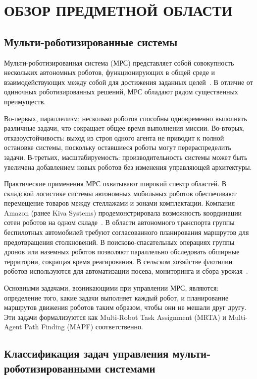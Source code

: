 \section{ОБЗОР ПРЕДМЕТНОЙ ОБЛАСТИ}

\subsection{Мульти-роботизированные системы}

Мульти-роботизированная система (МРС) представляет собой совокупность нескольких автономных роботов, функционирующих в общей среде и взаимодействующих между собой для достижения заданных целей~\cite{parker2008mrs}. В отличие от одиночных роботизированных решений, МРС обладают рядом существенных преимуществ.

Во-первых, параллелизм: несколько роботов способны одновременно выполнять различные задачи, что сокращает общее время выполнения миссии. Во-вторых, отказоустойчивость: выход из строя одного агента не приводит к полной остановке системы, поскольку оставшиеся роботы могут перераспределить задачи. В-третьих, масштабируемость: производительность системы может быть увеличена добавлением новых роботов без изменения управляющей архитектуры.

Практические применения МРС охватывают широкий спектр областей. В складской логистике системы автономных мобильных роботов обеспечивают перемещение товаров между стеллажами и зонами комплектации. Компания Amazon (ранее Kiva Systems) продемонстрировала возможность координации сотен роботов на одном складе~\cite{wurman2008kiva}. В области автономного транспорта группы беспилотных автомобилей требуют согласованного планирования маршрутов для предотвращения столкновений. В поисково-спасательных операциях группы дронов или наземных роботов позволяют параллельно обследовать обширные территории, сокращая время реагирования. В сельском хозяйстве флотилии роботов используются для автоматизации посева, мониторинга и сбора урожая~\cite{lavalle2006planning}.

Основными задачами, возникающими при управлении МРС, являются: определение того, какие задачи выполняет каждый робот, и планирование маршрутов движения роботов таким образом, чтобы они не мешали друг другу. Эти задачи формализуются как Multi-Robot Task Assignment (MRTA) и Multi-Agent Path Finding (MAPF) соответственно.

\subsection{Классификация задач управления мульти-роботизированными системами}

